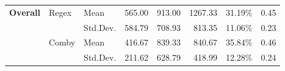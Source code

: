 \documentclass[acmsmall,screen,review,anonymous]{acmart}
\newcommand{\mr}[2]{\multirow{#1}{*}{#2}}
\begin{document}
{\begin{table}[hbtp]
\begin{varwidth}{.9\columnwidth}
\begin{tabularx}{\linewidth}{Xllrrrrc}
\multirow{4}{*}{\textbf{Overall}} & \multirow{2}{*}{Regex} & Mean &  565.00 & 913.00 & 1267.33 & 31.19\%  & 0.45\\
    &   &  Std.Dev. & 584.79  & 708.93 & 813.35 & 11.06\%  & 0.23\\\cline{2-8}
 & \multirow{2}{*}{Comby} & Mean & 416.67 & 839.33 & 840.67 & 35.84\% & 0.46\\
  &   &  Std.Dev. &  211.62 & 628.79 & 418.99 & 12.28\%  & 0.24 \\\bottomrule
\end{tabularx}
\end{varwidth}
\end{table}


}
\end{document}
